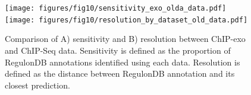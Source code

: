 \documentclass{bmcart}
\begin{document}
\newpage
\begin{figure}[h!]
  \centering
  \texttt{[image: figures/fig10/sensitivity\_exo\_olda\_data.pdf]}
  \texttt{[image: figures/fig10/resolution\_by\_dataset\_old\_data.pdf]}
  \caption{Comparison of A) sensitivity and B) resolution between
    ChIP-exo and ChIP-Seq data. Sensitivity is defined as the
    proportion of RegulonDB annotations identified using each
    data. Resolution is defined as the distance between RegulonDB
    annotation and its closest prediction.}
  \label{fig:reso_all}
\end{figure}
\end{document}
